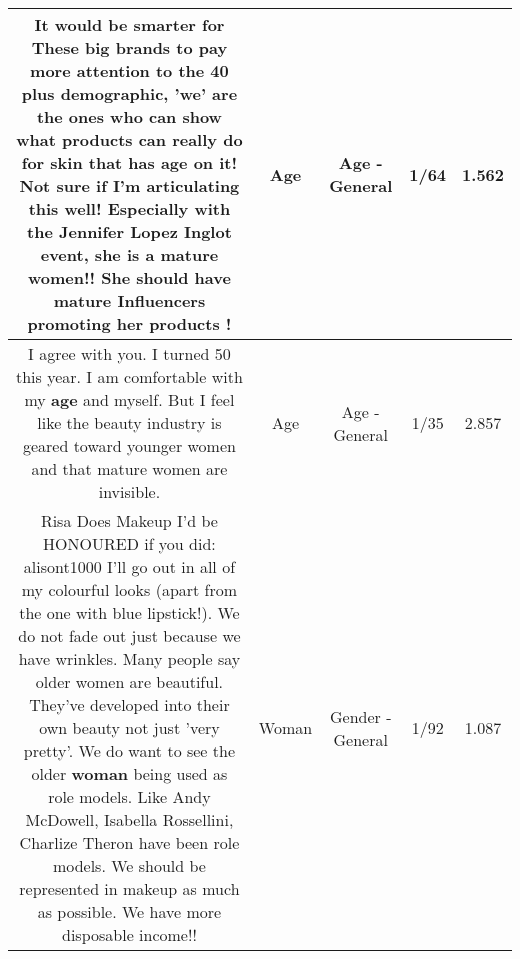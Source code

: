 \documentclass[11pt]{article}
\newlength\mylength
\begin{document}
\begin{center}
\begin{longtable}{|C{.65\mylength}|C{.30\mylength}|C{.12\mylength}|C{.12\mylength}|C{.12\mylength}|}
  \small It would be smarter for These big brands to pay more attention to the 40 plus demographic, 'we' are the ones who can show what products can really do for skin that has \textbf{age} on it! Not sure if I'm articulating this well! Especially with the Jennifer Lopez Inglot event, she is a mature women!! She should have mature Influencers promoting her products !\normalsize   & Age & Age - General & 1/64 & 1.562 \\  \hline
  \small I agree with you.   I turned 50 this year.  I am comfortable with my \textbf{age} and myself.  But I feel like the beauty industry is geared toward younger women and that mature women are invisible.\normalsize   & Age & Age - General & 1/35 & 2.857 \\  \hline
  \small Risa Does Makeup I'd be HONOURED if you did: alisont1000 I'll go out in all of my colourful looks (apart from the one with blue lipstick!). We do not fade out just because we have wrinkles. Many people say older women are beautiful. They've developed into their own beauty not just 'very pretty'. We do want to see the older \textbf{woman} being used as role models. Like Andy McDowell, Isabella Rossellini, Charlize Theron have been role models. We should be represented in makeup as much as possible. We have more disposable income!!\normalsize   & Woman & Gender - General & 1/92 & 1.087 \\  \hline
  
\end{longtable}
\end{center}
\end{document}
